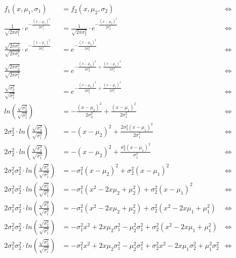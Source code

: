 \documentclass[12pt]{article}
\begin{document}
\begin{align*}
f_1(x,\mu_1,\sigma_1) &= f_2(x,\mu_2,\sigma_2) &\Leftrightarrow\\
\frac{1}{\sqrt{2 \pi \sigma_1^2}} \cdot e^{-\frac{(x-\mu_1)^2}{2\sigma_1^2}} &= \frac{1}{\sqrt{2 \pi \sigma_2^2}} \cdot e^{-\frac{(x-\mu_2)^2}{2 \sigma_2^2}} &\Leftrightarrow\\
\frac{\sqrt{2 \pi \sigma_2^2}}{\sqrt{2 \pi \sigma_1^2}} \cdot e^{-\frac{(x-\mu_1)^2}{2\sigma_1^2}} &= e^{-\frac{(x-\mu_2)^2}{2 \sigma_2^2}} &\Leftrightarrow\\
\frac{\sqrt{2 \pi \sigma_2^2}}{\sqrt{2 \pi \sigma_1^2}} &= e^{-\frac{(x-\mu_2)^2}{2 \sigma_2^2} + {\frac{(x-\mu_1)^2}{2\sigma_1^2}}} &\Leftrightarrow\\
\frac{\sqrt{\sigma_2^2}}{\sqrt{\sigma_1^2}} &= e^{-\frac{(x-\mu_2)^2}{2 \sigma_2^2} + {\frac{(x-\mu_1)^2}{2\sigma_1^2}}} &\Leftrightarrow\\
ln \left(\frac{\sqrt{\sigma_2^2}}{\sqrt{\sigma_1^2}}\right) &= -\frac{(x-\mu_2)^2}{2 \sigma_2^2} + {\frac{(x-\mu_1)^2}{2\sigma_1^2}} &\Leftrightarrow\\
2 \sigma_2^2 \cdot ln \left(\frac{\sqrt{\sigma_2^2}}{\sqrt{\sigma_1^2}}\right) &= -(x-\mu_2)^2 + {\frac{2 \sigma_2^2 (x-\mu_1)^2}{2\sigma_1^2}} &\Leftrightarrow\\
2 \sigma_2^2 \cdot ln \left(\frac{\sqrt{\sigma_2^2}}{\sqrt{\sigma_1^2}}\right) &= -(x-\mu_2)^2 + {\frac{\sigma_2^2 (x-\mu_1)^2}{\sigma_1^2}} &\Leftrightarrow\\
2 \sigma_1^2 \sigma_2^2 \cdot ln \left(\frac{\sqrt{\sigma_2^2}}{\sqrt{\sigma_1^2}}\right) &= -\sigma_1^2(x-\mu_2)^2 + {\sigma_2^2 (x-\mu_1)^2} &\Leftrightarrow\\
2 \sigma_1^2 \sigma_2^2 \cdot ln \left(\frac{\sqrt{\sigma_2^2}}{\sqrt{\sigma_1^2}}\right) &= -\sigma_1^2(x^2 -2x\mu_2 + \mu_2^2) + {\sigma_2^2 (x-\mu_1)^2} &\Leftrightarrow\\
2 \sigma_1^2 \sigma_2^2 \cdot ln \left(\frac{\sqrt{\sigma_2^2}}{\sqrt{\sigma_1^2}}\right) &= -\sigma_1^2(x^2 -2x\mu_2 + \mu_2^2) + {\sigma_2^2 (x^2-2x\mu_1+\mu_1^2)} &\Leftrightarrow\\
2 \sigma_1^2 \sigma_2^2 \cdot ln \left(\frac{\sqrt{\sigma_2^2}}{\sqrt{\sigma_1^2}}\right) &= -\sigma_1^2x^2 +2x\mu_2\sigma_1^2 - \mu_2^2\sigma_1^2 + \sigma_2^2 (x^2-2x\mu_1+\mu_1^2) &\Leftrightarrow\\
2 \sigma_1^2 \sigma_2^2 \cdot ln \left(\frac{\sqrt{\sigma_2^2}}{\sqrt{\sigma_1^2}}\right) &= -\sigma_1^2x^2 +2x\mu_2\sigma_1^2 - \mu_2^2\sigma_1^2 + \sigma_2^2 x^2 -2x\mu_1\sigma_2^2 + \mu_1^2\sigma_2^2 &\Leftrightarrow\\

\end{align*}
\end{document}
